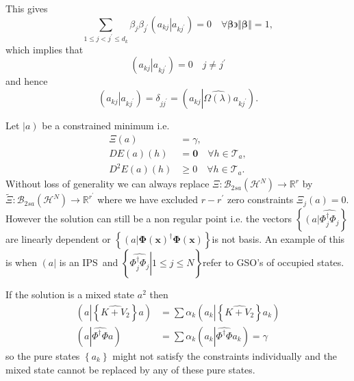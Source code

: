 \documentclass[aps,preprint]{revtex4}%
\begin{document}
This gives
\begin{equation}
\sum_{1\leq j<j^{\prime}\leq d_{k}}\beta_{j}\beta_{j^{\prime}}\left(  \left.
\overset{}{a_{kj}}\right\vert a_{kj^{\prime}}\right)  =0\quad\forall
\mathbf{\beta\backepsilon}\left\Vert \mathbf{\beta}\right\Vert =1,
\end{equation}
which implies that
\begin{equation}
\left(  \left.  \overset{}{a_{kj}}\right\vert a_{kj^{\prime}}\right)  =0\quad
j\neq j^{\prime}%
\end{equation}
and hence
\begin{equation}
\left(  \left.  \overset{}{a_{kj}}\right\vert a_{kj^{\prime}}\right)
=\delta_{jj^{\prime}}=\left(  a_{kj}\left\vert \widehat{\Omega\left(
\lambda\right)  }\right.  a_{kj^{\prime}}\right)  .
\end{equation}


Let $\left\vert \overset{}{a}\right)  $ be a constrained minimum i.e.
\begin{align}
\Xi\left(  a\right)   &  =\gamma,\nonumber\\
DE\left(  a\right)  \left(  h\right)   &  =\mathbf{0}\quad\forall
h\in\mathcal{T}_{a},\nonumber\\
D^{2}E\left(  a\right)  \left(  h\right)   &  \geq0\quad\forall h\in
\mathcal{T}_{a}.
\end{align}
Without loss of generality we can always replace $\Xi:\mathcal{B}_{2sa}\left(
\mathcal{H}^{N}\right)  \rightarrow\mathbb{R}^{r}$ by $\tilde{\Xi}%
:\mathcal{B}_{2sa}\left(  \mathcal{H}^{N}\right)  \rightarrow\mathbb{R}%
^{r^{\prime}}$ where we have excluded $r-r^{\prime}$ zero constraints $\Xi
_{j}\left(  a\right)  =0.$ However the solution can still be a non regular
point i.e. the vectors $\left\{  \left(  \overset{}{a}\right\vert
\widehat{\Phi_{j}^{\dagger}\Phi_{j}}\right\}  $ are linearly dependent or
$\left\{  \left(  \overset{}{a}\right\vert \mathbf{\Phi}\left(  \mathbf{x}%
\right)  ^{\dagger}\mathbf{\Phi}\left(  \mathbf{x}\right)  \right\}  $is not
basis. An example of this is when $\left(  a\right\vert $ is an IPS\ and
$\left\{  \left.  \widehat{\Phi_{j}^{\dagger}\Phi_{j}}\right\vert 1\leq j\leq
N\right\}  $refer to GSO's of occupied states.

If the solution is a mixed state $a^{2}$ then
\begin{align}
\left(  a\left\vert \left\{  \widehat{K+V_{2}}\right\}  \right.  a\right)   &
=\sum\alpha_{k}\left(  a_{k}\left\vert \left\{  \widehat{K+V_{2}}\right\}
\right.  a_{k}\right) \nonumber\\
\left(  a\left\vert \widehat{\Phi^{\dagger}\Phi}\right.  a\right)   &
=\sum\alpha_{k}\left(  a_{k}\left\vert \widehat{\Phi^{\dagger}\Phi}\right.
a_{k}\right)  =\gamma
\end{align}
so the pure states $\left\{  a_{k}\right\}  $ might not satisfy the
constraints individually and the mixed state cannot be replaced by any of
these pure states.
\end{document}
